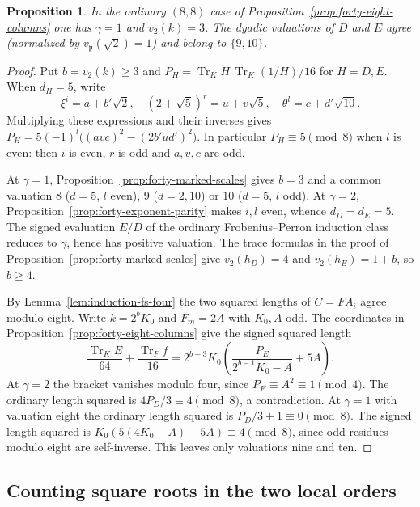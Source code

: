 \documentclass[11pt,reqno]{amsart}
\newtheorem{proposition}[theorem]{Proposition}
\theoremstyle{remark}\newtheorem{remark}[theorem]{Remark}
\numberwithin{equation}{section}
\begin{document}
\begin{proposition}\label{prop:forty-eight-norm}
In the ordinary $(8,8)$ case of Proposition~\ref{prop:forty-eight-columns} one has $\gamma=1$ and $v_2(k)=3$. The dyadic valuations of $D$ and $E$ agree (normalized by $v_{\mathfrak p}(\sqrt2)=1$) and belong to $\{9,10\}$.
\end{proposition}
\begin{proof}
Put $b=v_2(k)\ge3$ and
$P_H=\operatorname{Tr}_K H\,\operatorname{Tr}_K(1/H)/16$ for $H=D,E$.
When $d_H=5$, write
\[
  \xi^i=a+b'\sqrt2,\quad (2+\sqrt5)^r=u+v\sqrt5,\quad
  \theta^l=c+d'\sqrt{10}.
\]
Multiplying these expressions and their inverses gives
$P_H=5(-1)^l\big((avc)^2-(2b'ud')^2\big)$.
In particular $P_H\equiv5\pmod8$ when $l$ is even: then $i$ is
even, $r$ is odd and $a,v,c$ are odd.

At $\gamma=1$, Proposition~\ref{prop:forty-marked-scales} gives $b=3$
and a common valuation $8$ ($d=5$, $l$ even), $9$ ($d=2,10$) or
$10$ ($d=5$, $l$ odd). At $\gamma=2$,
Proposition~\ref{prop:forty-exponent-parity} makes $i,l$ even, whence
$d_D=d_E=5$. The signed evaluation $E/D$ of the ordinary
Frobenius--Perron induction class reduces to $\gamma$, hence has
positive valuation. The trace formulas in the proof of
Proposition~\ref{prop:forty-marked-scales} give
$v_2(h_D)=4$ and $v_2(h_E)=1+b$, so $b\ge4$.

By Lemma~\ref{lem:induction-fs-four} the two squared lengths of
$C=FA_i$ agree modulo eight. Write $k=2^bK_0$ and $F_m=2A$ with
$K_0,A$ odd. The coordinates in Proposition~\ref{prop:forty-eight-columns}
give the signed squared length
\[
  \frac{\operatorname{Tr}_K E}{64}
    +\frac{\operatorname{Tr}_F f}{16}
   =2^{b-3}K_0\left(\frac{P_E}{2^{b-1}K_0-A}+5A\right).
\]
At $\gamma=2$ the bracket vanishes modulo four, since
$P_E\equiv A^2\equiv1\pmod4$. The ordinary length squared is
$4P_D/3\equiv4\pmod8$, a contradiction. At $\gamma=1$ with
valuation eight the ordinary length squared is $P_D/3+1\equiv0\pmod8$.
The signed length squared is
$K_0(5(4K_0-A)+5A)\equiv4\pmod8$, since odd residues modulo eight
are self-inverse. This leaves only valuations nine and ten.
\end{proof}

\subsection{Counting square roots in the two local orders}
\end{document}
